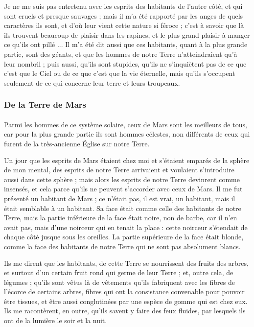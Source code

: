 \documentclass[a4paper, 11pt, oneside]{article}
\begin{document}
Je ne me suis pas entretenu avec les esprits des habitants de l'autre côté, et qui sont cruels et presque sauvages ; mais il m'a été rapporté par les anges de quels caractères ils sont, et d'où leur vient cette nature si féroce ; c'est à savoir que là ils trouvent beaucoup de plaisir dans les rapines, et le plus grand plaisir à manger ce qu'ils ont pillé ... Il m'a été dit aussi que ces habitants, quant à la plus grande partie, sont des géants, et que les hommes de notre Terre n'atteindraient qu'à leur nombril ; puis aussi, qu'ils sont stupides, qu'ils ne s'inquiètent pas de ce que c'est que le Ciel ou de ce que c'est que la vie éternelle, mais qu'ils s'occupent seulement de ce qui concerne leur terre et leurs troupeaux.

\subsubsection{De la Terre de Mars}
\paragraph{}
Parmi les hommes de ce système solaire, ceux de Mars sont les meilleurs de tous, car pour la plus grande partie ils sont hommes célestes, non différents de ceux qui furent de la très-ancienne Église sur notre Terre.

Un jour que les esprits de Mars étaient chez moi et s'étaient emparés de la sphère de mon mental, des esprits de notre Terre arrivaient et voulaient s'introduire aussi dans cette sphère ; mais alors les esprits de notre Terre devinrent comme insensés, et cela parce qu'ils ne peuvent s'accorder avec ceux de Mars. Il me fut présenté un habitant de Mars ; ce n'était pas, il est vrai, un habitant, mais il était semblable à un habitant. Sa face était comme celle des habitants de notre Terre, mais la partie inférieure de la face était noire, non de barbe, car il n'en avait pas, mais d'une noirceur qui en tenait la place : cette noirceur s'étendait de chaque côté jusque sous les oreilles. La partie supérieure de la face était blonde, comme la face des habitants de notre Terre qui ne sont pas absolument blancs.

Ils me dirent que les habitants, de cette Terre se nourrissent des fruits des arbres, et surtout d'un certain fruit rond qui germe de leur Terre ; et, outre cela, de légumes ; qu'ils sont vêtus là de vêtements qu'ils fabriquent avec les fibres de l'écorce de certains arbres, fibres qui ont la consistance convenable pour pouvoir être tissues, et être aussi conglutinées par une espèce de gomme qui est chez eux. Ils me racontèrent, en outre, qu'ils savent y faire des feux fluides, par lesquels ils ont de la lumière le soir et la nuit.
\end{document}
